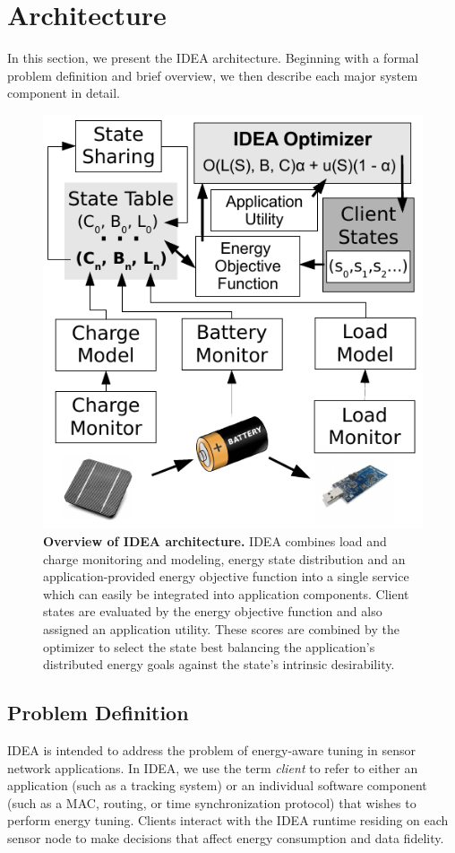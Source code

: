 \section{Architecture}
\label{idea-sec-architecture}

In this section, we present the IDEA architecture. Beginning with a formal
problem definition and brief overview, we then describe each major system
component in detail.

\begin{figure}[t]
\begin{center}
\includegraphics[width=0.5\hsize]{./5-idea/figs/architecture.pdf}
\end{center}

\caption{\textbf{Overview of IDEA architecture.} IDEA combines load and
charge monitoring and modeling, energy state distribution and an
application-provided energy objective function into a single service which
can easily be integrated into application components. Client states are
evaluated by the energy objective function and also assigned an application
utility. These scores are combined by the optimizer to select the state best
balancing the application's distributed energy goals against the state's
intrinsic desirability.}

\label{idea-fig-architecture}
\end{figure}

\subsection{Problem Definition}

IDEA is intended to address the problem of energy-aware tuning in sensor
network applications. In IDEA, we use the term \textit{client} to refer to
either an application (such as a tracking system) or an individual software
component (such as a MAC, routing, or time synchronization protocol) that
wishes to perform energy tuning. Clients interact with the IDEA runtime
residing on each sensor node to make decisions that affect energy consumption
and data fidelity.

